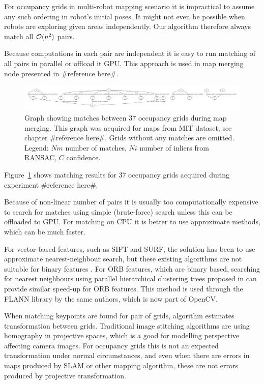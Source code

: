 For occupancy grids in multi-robot mapping scenario it is impractical to assume any such ordering in robot's initial poses. It might not even be possible when robots are exploring given areas independently. Our algorithm therefore always match all $\operatorname{\mathcal{O}}(n^2)$ pairs.

Because computations in each pair are independent it is easy to run matching of all pairs in parallel or offload it GPU. This approach is used in map merging node presented in \#reference here\#.

\begin{figure}
    \centering
    \includegraphics[width=\textwidth]{../img/matches.pdf}
    \caption{Graph showing matches between $37$ occupancy grids during map merging. This graph was acquired for maps from MIT dataset, see chapter \#reference here\#. Grids without any matches are omitted. Legend: $Nm$ number of matches, $Ni$ number of inliers from RANSAC, $C$ confidence.}
    \label{fig:matches}
\end{figure}

Figure~\ref{fig:matches} shows matching results for $37$ occupancy grids acquired during experiment \#reference here\#.

Because of non-linear number of pairs it is usually too computationally expensive to search for matches using simple (brute-force) search unless this can be offloaded to GPU. For matching on CPU it is better to use approximate methods, which can be much faster.

For vector-based features, such as SIFT and SURF, the solution has been to use approximate nearest-neighbour search, but these existing algorithms are not suitable for binary features \cite{Muja2012}. For ORB features, which are binary based, searching for nearest neighbours using parallel hierarchical clustering trees proposed in \cite{Muja2012} can provide similar speed-up for ORB features. This method is used through the FLANN library by the same authors, which is now part of OpenCV.

When matching keypoints are found for pair of grids, algorithm estimates transformation between grids. Traditional image stitching algorithms are using homography in projective spaces, which is a good for modelling perspective affecting camera images. For occupancy grids this is not an expected transformation under normal circumstances, and even when there are errors in maps produced by SLAM or other mapping algorithm, these are not errors produced by projective transformation.

